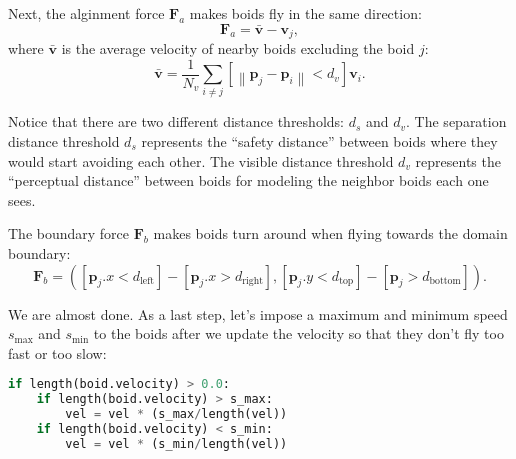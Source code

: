 Next, the alginment force $\mathbf{F}_a$ makes boids fly in the same direction:
\begin{equation}
\mathbf{F}_a = \bar{\mathbf{v}} - \mathbf{v}_j,
\end{equation}
where $\bar{\mathbf{v}}$ is the average velocity of nearby boids excluding the boid $j$:
\begin{equation}
\bar{\mathbf{v}} = \frac{1}{N_v} \sum_{i \neq j} \left[\left\|\mathbf{p}_j - \mathbf{p}_i\right\| < d_v\right] \mathbf{v}_i.
\end{equation}

Notice that there are two different distance thresholds: $d_s$ and $d_v$. The separation distance threshold $d_s$ represents the ``safety distance'' between boids where they would start avoiding each other. The visible distance threshold $d_v$ represents the ``perceptual distance'' between boids for modeling the neighbor boids each one sees.

The boundary force $\mathbf{F}_b$ makes boids turn around when flying towards the domain boundary:
\begin{equation}
\mathbf{F}_b = \left(\left[\mathbf{p}_j.x < d_{\text{left}}\right] - \left[\mathbf{p}_j.x > d_{\text{right}}\right], \left[\mathbf{p}_j.y < d_{\text{top}}\right] - \left[\mathbf{p}_j > d_{\text{bottom}}\right]\right).
\end{equation}

We are almost done. As a last step, let's impose a maximum and minimum speed $s_{\text{max}}$ and $s_{\text{min}}$ to the boids after we update the velocity so that they don't fly too fast or too slow:
\begin{lstlisting}[language=Python]
if length(boid.velocity) > 0.0:
    if length(boid.velocity) > s_max:
        vel = vel * (s_max/length(vel))
    if length(boid.velocity) < s_min:
        vel = vel * (s_min/length(vel))
\end{lstlisting}

